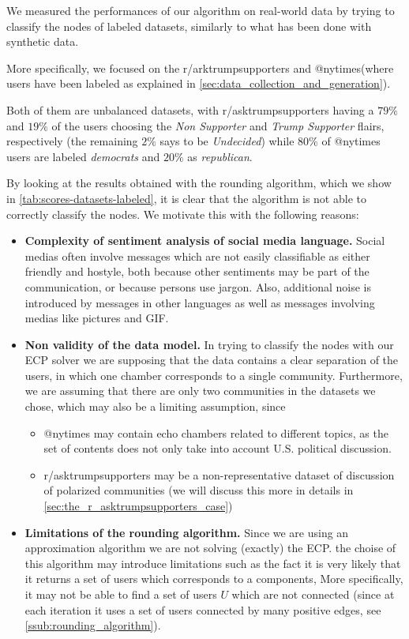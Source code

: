 We measured the performances of our algorithm on real-world data by trying to
classify the nodes of labeled datasets, similarly to what has been done
with synthetic data.

More specifically, we focused on the r/arktrumpsupporters and
@nytimes\footnotemark (where users have been labeled as explained in
\autoref{sec:data_collection_and_generation}).

Both of them are unbalanced datasets, with r/asktrumpsupporters having a $79\%$
and $19\%$ of the users choosing the \emph{Non Supporter} and \emph{Trump
	Supporter} flairs, respectively (the remaining $2\%$ says to be
\emph{Undecided}) while $80\%$ of @nytimes users are labeled \emph{democrats}
and $20\%$ as \emph{republican}.

By looking at the results obtained with the rounding algorithm, which we show in
\autoref{tab:scores-datasets-labeled}, it is clear that the algorithm is not
able to correctly classify the nodes. We motivate this with the following
reasons:
\begin{itemize}
	\item \textbf{Complexity of sentiment analysis of social media language.}
	      Social medias often involve messages which are not easily classifiable
	      as either friendly and hostyle, both because other sentiments may be
	      part of the communication, or because persons use jargon. Also,
	      additional noise is introduced by messages in other languages as well
	      as messages involving medias like pictures and GIF.
	\item \textbf{Non validity of the data model.} In trying to classify the
	      nodes with our \acrshort{ECP} solver we are supposing that the data
	      contains a clear separation of the users, in which one chamber
	      corresponds to a single community. Furthermore, we are assuming that
	      there are only two communities in the datasets we chose, which may also
	      be a limiting assumption, since
	      \begin{itemize}
		      \item @nytimes may contain echo chambers related to different
		            topics, as the set of contents does not only take into account
		            U.S. political discussion.
		      \item r/asktrumpsupporters may be a non-representative
		            dataset of discussion of polarized communities (we will
		            discuss this more in details in
		            \autoref{sec:the_r_asktrumpsupporters_case})
	      \end{itemize}
	\item \textbf{Limitations of the rounding algorithm.} Since we are
	      using an approximation algorithm we are not solving (exactly) the
	      \acrshort{ECP}. the choise of this algorithm may introduce limitations
	      such as the fact it is very likely that it returns a set of users which
	      corresponds to a components,
	      More specifically, it may not be able to find a set of users $U$ which
	      are not connected (since at each iteration it uses a set of users
	      connected by many positive edges, see
	      \autoref{ssub:rounding_algorithm}).
\end{itemize}

